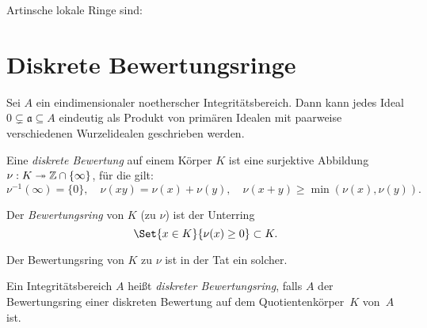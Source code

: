 \documentclass{cheat-sheet}
\newcommand{\aaa}{\mathfrak{a}}
\newcommand{\thra}{\twoheadrightarrow}
\begin{document}
\begin{bspe}
  Artinsche lokale Ringe sind:
  \begin{itemize}
     \quad
  \end{itemize}
\end{bspe}


\section{Diskrete Bewertungsringe}


\begin{prop}
  Sei $A$ ein eindimensionaler noetherscher Integritätsbereich.
  Dann kann jedes Ideal $0 \subsetneq \aaa \subseteq A$ eindeutig als Produkt von primären Idealen mit paarweise verschiedenen Wurzelidealen geschrieben werden.
\end{prop}


\begin{defn}
  Eine \emph{diskrete Bewertung} auf einem Körper $K$ ist eine surjektive Abbildung $\nu : K \thra \Z \cap \{ \infty \}$, für die gilt:
  \[
    \nu^{-1}(\infty) = \{ 0 \}, \quad
    \nu(xy) = \nu(x) + \nu(y), \quad
    \nu(x + y) \geq \min (\nu(x), \nu(y)).
  \]
\end{defn}

\begin{lem}
   \quad
\end{lem}

\begin{defn}
  Der \emph{Bewertungsring} von $K$ (zu $\nu$) ist der Unterring
  \[
    \Set{x \in K}{\nu(x) \geq 0} \subset K.
  \]
\end{defn}

\begin{lem}
  Der Bewertungsring von $K$ zu $\nu$ ist in der Tat ein solcher.
\end{lem}

\begin{defn}
  Ein Integritätsbereich $A$ heißt \emph{diskreter Bewertungsring}, falls $A$ der Bewertungsring einer diskreten Bewertung auf dem Quotientenkörper~$K$ von~$A$ ist.
\end{defn}
\end{document}
